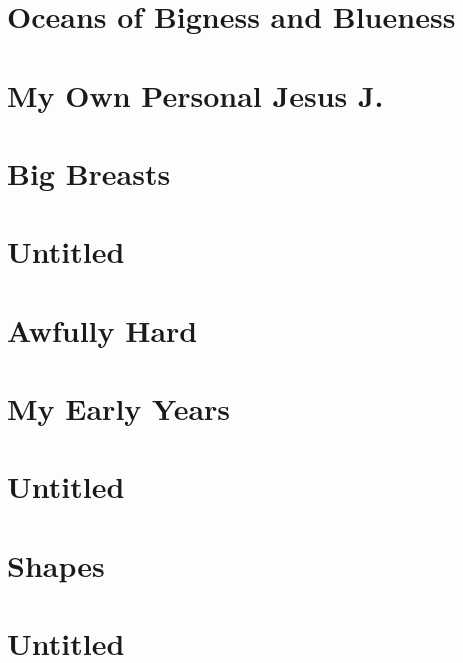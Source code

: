\documentclass[oneside,14pt]{memoir} %
\newcommand{\chapterXVIIvar}{poem/this_big_sky_is_all_mine.tex}
\newcommand{\chapterXVIIIvar}{poem/oceans_of_bigness_and_blueness.tex}
\newcommand{\chapterXIXvar}{poem/my_own_personal_jesus_j.tex}
\newcommand{\chapterXXvar}{poem/big_breasts.tex}
\newcommand{\chapterXXIvar}{poem/untitled_4.tex}
\newcommand{\chapterXXIIvar}{poem/awfully_hard.tex}
\newcommand{\chapterXXIIIvar}{poem/my_early_years.tex}
\newcommand{\chapterXXIVvar}{poem/untitled_5.tex}
\newcommand{\chapterXXVvar}{poem/shapes.tex}
\begin{document}


\chapter{Oceans of Bigness and Blueness}



\chapter{My Own Personal Jesus J.}



\chapter{Big Breasts}



\chapter{Untitled}



\chapter{Awfully Hard}



\chapter{My Early Years}



\chapter{Untitled}



\chapter{Shapes}



\chapter{Untitled}
\end{document}
